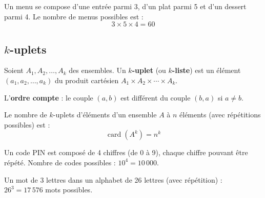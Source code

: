 \documentclass[12pt,a4paper,twoside]{book}
\DeclareMathOperator{\card}{card}
\begin{document}
\begin{exemple}
Un menu se compose d'une entrée parmi 3, d'un plat parmi 5 et d'un dessert parmi 4. Le nombre de menus possibles est :
\[ 3 \times 5 \times 4 = 60 \]
\end{exemple}

\begin{center}
\end{center}

\subsection{$k$-uplets}

\begin{definition}[$k$-uplet]
Soient $A_1, A_2, \ldots, A_k$ des ensembles. Un \textbf{$k$-uplet} (ou \textbf{$k$-liste}) est un élément $(a_1, a_2, \ldots, a_k)$ du produit cartésien $A_1 \times A_2 \times \cdots \times A_k$.

L'\textbf{ordre compte} : le couple $(a, b)$ est différent du couple $(b, a)$ si $a \neq b$.
\end{definition}

\begin{propriete}
Le nombre de $k$-uplets d'éléments d'un ensemble $A$ à $n$ éléments (avec répétitions possibles) est :
\[ \card(A^k) = n^k \]
\end{propriete}

\begin{exemple}
Un code PIN est composé de 4 chiffres (de 0 à 9), chaque chiffre pouvant être répété. Nombre de codes possibles : $10^4 = 10\,000$.

\medskip

Un mot de 3 lettres dans un alphabet de 26 lettres (avec répétition) : $26^3 = 17\,576$ mots possibles.
\end{exemple}
\end{document}
